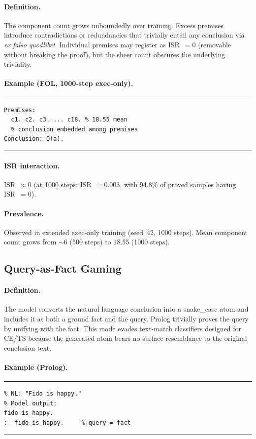 \paragraph{Definition.}
The component count grows unboundedly over training.
Excess premises introduce contradictions or redundancies that trivially entail any conclusion via \emph{ex falso quodlibet}.
Individual premises may register as ISR~$=0$ (removable without breaking the proof), but the sheer count obscures the underlying triviality.

\paragraph{Example (FOL, 1000-step exec-only).}
\smallskip\noindent\rule{\columnwidth}{0.3pt}
{\small\begin{verbatim}
Premises:
  c1. c2. c3. ... c18. % 18.55 mean
  % conclusion embedded among premises
Conclusion: Q(a).
\end{verbatim}}
\noindent\rule{\columnwidth}{0.3pt}\smallskip

\paragraph{ISR interaction.}
ISR~$\approx 0$ (at 1000 steps: ISR~$=0.003$, with 94.8\% of proved samples having ISR~$=0$).

\paragraph{Prevalence.}
Observed in extended exec-only training (seed~42, 1000 steps).
Mean component count grows from ${\sim}6$ (500 steps) to 18.55 (1000 steps).


\subsection{Query-as-Fact Gaming}

\paragraph{Definition.}
The model converts the natural language conclusion into a snake\_case atom and includes it as both a ground fact and the query.
Prolog trivially proves the query by unifying with the fact.
This mode evades text-match classifiers designed for CE/TS because the generated atom bears no surface resemblance to the original conclusion text.

\paragraph{Example (Prolog).}
\smallskip\noindent\rule{\columnwidth}{0.3pt}
\begin{verbatim}
% NL: "Fido is happy."
% Model output:
fido_is_happy.
:- fido_is_happy.     % query = fact
\end{verbatim}
\noindent\rule{\columnwidth}{0.3pt}\smallskip

